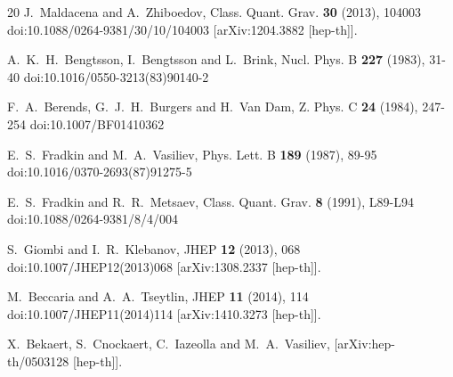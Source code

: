 \documentclass[12pt]{article}
\begin{document}
\begin{thebibliography}{20}
J.~Maldacena and A.~Zhiboedov,
Class. Quant. Grav. \textbf{30} (2013), 104003
doi:10.1088/0264-9381/30/10/104003
[arXiv:1204.3882 [hep-th]].

A.~K.~H.~Bengtsson, I.~Bengtsson and L.~Brink,
Nucl. Phys. B \textbf{227} (1983), 31-40
doi:10.1016/0550-3213(83)90140-2

F.~A.~Berends, G.~J.~H.~Burgers and H.~Van Dam,
Z. Phys. C \textbf{24} (1984), 247-254
doi:10.1007/BF01410362

E.~S.~Fradkin and M.~A.~Vasiliev,
Phys. Lett. B \textbf{189} (1987), 89-95
doi:10.1016/0370-2693(87)91275-5

E.~S.~Fradkin and R.~R.~Metsaev,
Class. Quant. Grav. \textbf{8} (1991), L89-L94
doi:10.1088/0264-9381/8/4/004

S.~Giombi and I.~R.~Klebanov,
JHEP \textbf{12} (2013), 068
doi:10.1007/JHEP12(2013)068
[arXiv:1308.2337 [hep-th]].

M.~Beccaria and A.~A.~Tseytlin,
JHEP \textbf{11} (2014), 114
doi:10.1007/JHEP11(2014)114
[arXiv:1410.3273 [hep-th]].

X.~Bekaert, S.~Cnockaert, C.~Iazeolla and M.~A.~Vasiliev,
[arXiv:hep-th/0503128 [hep-th]].


\end{thebibliography}
\end{document}
